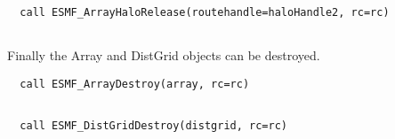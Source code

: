  \begin{verbatim}
  call ESMF_ArrayHaloRelease(routehandle=haloHandle2, rc=rc)
 
\end{verbatim}
 

   Finally the Array and DistGrid objects can be destroyed. 

 \begin{verbatim}
  call ESMF_ArrayDestroy(array, rc=rc)
 
\end{verbatim}
 

 \begin{verbatim}
  call ESMF_DistGridDestroy(distgrid, rc=rc)
 
\end{verbatim}

\setlength{\parskip}{\oldparskip}
\setlength{\parindent}{\oldparindent}
\setlength{\baselineskip}{\oldbaselineskip}
